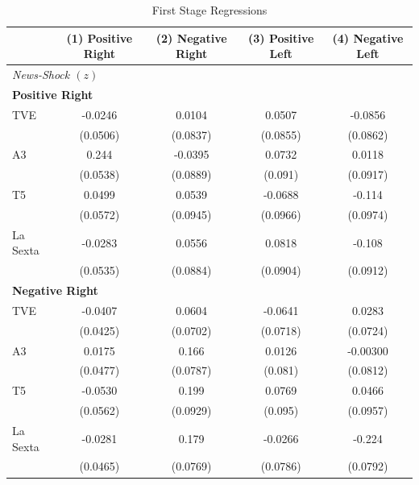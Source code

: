 \documentclass[12pt]{article}
\begin{document}
	\begin{table}[htbp]
		\centering
		\scriptsize
		\setlength{\tabcolsep}{4pt}
		\renewcommand{\arraystretch}{0.9}
		\caption{First Stage Regressions}
		\label{tab:first_stage}
		\begin{tabular}{lcccc}
			\hline
			\multicolumn{1}{c}{} & \textbf{(1) Positive Right} & \textbf{(2) Negative Right} & \textbf{(3) Positive Left} & \textbf{(4) Negative Left} \\
			\hline
			
			\multicolumn{5}{l}{\textit{News‐Shock $(z)$}}\\
			\hline
			
			\multicolumn{5}{l}{\textbf{Positive Right}}\\
			\hline
			TVE       & -0.0246       & 0.0104        & 0.0507        & -0.0856       \\
			& (0.0506)      & (0.0837)      & (0.0855)      & (0.0862)      \\
			A3        & 0.244\sym{***}& -0.0395       & 0.0732        & 0.0118        \\
			& (0.0538)      & (0.0889)      & (0.091)       & (0.0917)      \\
			T5        & 0.0499        & 0.0539        & -0.0688       & -0.114        \\
			& (0.0572)      & (0.0945)      & (0.0966)      & (0.0974)      \\
			La Sexta  & -0.0283       & 0.0556        & 0.0818        & -0.108        \\
			& (0.0535)      & (0.0884)      & (0.0904)      & (0.0912)      \\
			\hline
			
			\multicolumn{5}{l}{\textbf{Negative Right}}\\
			\hline
			TVE       & -0.0407       & 0.0604        & -0.0641       & 0.0283        \\
			& (0.0425)      & (0.0702)      & (0.0718)      & (0.0724)      \\
			A3        & 0.0175        & 0.166\sym{*}  & 0.0126        & -0.00300      \\
			& (0.0477)      & (0.0787)      & (0.081)       & (0.0812)      \\
			T5        & -0.0530       & 0.199\sym{*}  & 0.0769        & 0.0466        \\
			& (0.0562)      & (0.0929)      & (0.095)       & (0.0957)      \\
			La Sexta  & -0.0281       & 0.179\sym{**} & -0.0266       & -0.224\sym{**}\\
			& (0.0465)      & (0.0769)      & (0.0786)      & (0.0792)      \\
			\hline
			

\end{tabular}
\end{table}
\end{document}
